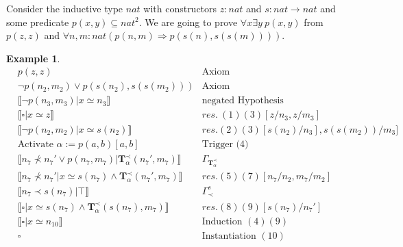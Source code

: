 \documentclass[onehalfspacing]{article}
\newtheorem{example}[theorem]{Example}
\newcommand{\llb}{\llbracket}
\newcommand{\rrb}{\rrbracket}
\begin{document}
Consider the inductive type $nat$ with constructors $z : nat$ and $s: nat \to nat$ and some predicate $p(x, y)\subseteq nat^2$. We are going to prove $\forall x\exists y\: p(x,y)$ from $p(z, z)$ and $\forall n,m:nat(p(n, m)\Rightarrow p(s(n), s(s(m))))$.



\begin{example}\hfill
	\begin{align}
		& p(z, z) & \text{Axiom}\\
		& \neg p(n_2, m_2)\vee p(s(n_2), s(s(m_2)))& \text{Axiom}\\
		& \llb \neg p(n_3, m_3) | x\simeq n_3\rrb & \text{negated Hypothesis}\\
		& \llb \square | x\simeq z\rrb & res.\:(1) (3) [z/n_3, z/m_3]\\
		& \llb \neg p(n_2, m_2) | x\simeq s(n_2)\rrb &res. (2) (3) [s(n_2)/n_3], s(s(m_2))/m_3]\\
		& \text{Activate $\alpha := p(a, b)[a, b]$}&\text{Trigger  (4)}\\
		& \llb n_7\not\prec n_7'\vee p(n_7, m_7) | \mathbf{T}_\alpha^\prec(n_7', m_7)\rrb& \Gamma_{\mathbf{T}_\alpha^\prec}\\
		& \llb n_7\not\prec n_7'| x\simeq s(n_7)\wedge \mathbf{T}_\alpha^\prec(n_7', m_7)\rrb & res. (5) (7) [n_7/n_2, m_7/ m_2] \\
		& \llb n_7\prec s(n_7)|\top\rrb &\Gamma_\prec^s\\
		& \llb \square | x\simeq s(n_7)\wedge\mathbf{T}_\alpha^\prec(s(n_7), m_7)\rrb&res. (8)(9)[s(n_7)/n_7']\\
		& \llb \square | x\simeq n_{10}\rrb &\text{Induction }(4)(9)\\
		& \square &\text{Instantiation }(10)
	\end{align}
\end{example}




\end{document}
